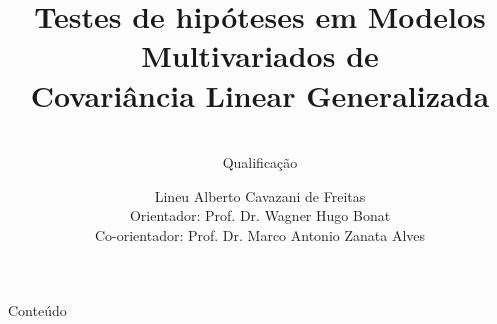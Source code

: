 \documentclass[10pt,
  aspectratio=169,
  serif,
  mathserif,
  professionalfont,
  compress,
  handout,
  ]{beamer}
\title[TH MCGLM]{
  \Large Testes de hipóteses em Modelos Multivariados de \\ Covariância Linear Generalizada}
\subtitle{ \\ Qualificação}
\author[Lineu Alberto]{\small
  Lineu Alberto Cavazani de Freitas \\
  Orientador: Prof. Dr. Wagner Hugo Bonat\\
  Co-orientador: Prof. Dr. Marco Antonio Zanata Alves
}
\institute[UFPR]{
    PPG Informática %
% 
 }
\date{}
\begin{document}
\frame{\titlepage}

 \begin{frame}{Conteúdo}
   \small{\tableofcontents}
 \end{frame}

\end{document}
